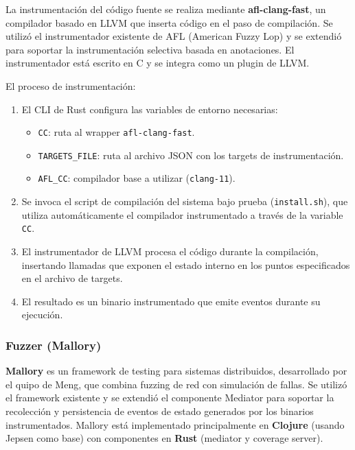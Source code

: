 \documentclass[12pt]{article}
\begin{document}
La instrumentación del código fuente se realiza mediante \textbf{afl-clang-fast}, un compilador basado en LLVM que inserta código en el paso de compilación. Se utilizó el instrumentador existente de AFL (American Fuzzy Lop) y se extendió para soportar la instrumentación selectiva basada en anotaciones. El instrumentador está escrito en C y se integra como un plugin de LLVM.

El proceso de instrumentación:

\begin{enumerate}
    \item El CLI de Rust configura las variables de entorno necesarias:
    \begin{itemize}
        \item \texttt{CC}: ruta al wrapper \texttt{afl-clang-fast}.
        \item \texttt{TARGETS\_FILE}: ruta al archivo JSON con los targets de instrumentación.
        \item \texttt{AFL\_CC}: compilador base a utilizar (\texttt{clang-11}).
    \end{itemize}
    
    \item Se invoca el script de compilación del sistema bajo prueba (\texttt{install.sh}), que utiliza automáticamente el compilador instrumentado a través de la variable \texttt{CC}.
    
    \item El instrumentador de LLVM procesa el código durante la compilación, insertando llamadas que exponen el estado interno en los puntos especificados en el archivo de targets.
    
    \item El resultado es un binario instrumentado que emite eventos durante su ejecución.
\end{enumerate}

\subsubsection{Fuzzer (Mallory)}

\textbf{Mallory} es un framework de testing para sistemas distribuidos, desarrollado por el quipo de Meng, que combina fuzzing de red con simulación de fallas. Se utilizó el framework existente y se extendió el componente Mediator para soportar la recolección y persistencia de eventos de estado generados por los binarios instrumentados. Mallory está implementado principalmente en \textbf{Clojure} (usando Jepsen como base) con componentes en \textbf{Rust} (mediator y coverage server).
\end{document}
